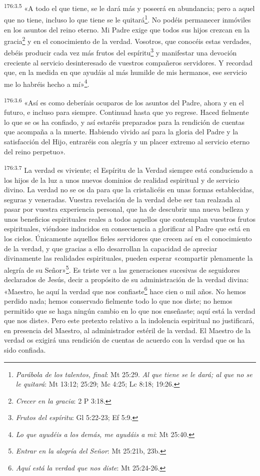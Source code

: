\par 
\textsuperscript{176:3.5} «A todo el que tiene, se le dará más y poseerá en abundancia; pero a aquel que no tiene, incluso lo que tiene se le quitará\footnote{\textit{Parábola de los talentos, final}: Mt 25:29. \textit{Al que tiene se le dará; al que no se le quitará}: Mt 13:12; 25:29; Mc 4:25; Lc 8:18; 19:26.}. No podéis permanecer inmóviles en los asuntos del reino eterno. Mi Padre exige que todos sus hijos crezcan en la gracia\footnote{\textit{Crecer en la gracia}: 2 P 3:18.} y en el conocimiento de la verdad. Vosotros, que conocéis estas verdades, debéis producir cada vez más frutos del espíritu\footnote{\textit{Frutos del espíritu}: Gl 5:22-23; Ef 5:9.} y manifestar una devoción creciente al servicio desinteresado de vuestros compañeros servidores. Y recordad que, en la medida en que ayudáis al más humilde de mis hermanos, ese servicio me lo habréis hecho a mí»\footnote{\textit{Lo que ayudéis a los demás, me ayudáis a mi}: Mt 25:40.}.

\par 
\textsuperscript{176:3.6} «Así es como deberíais ocuparos de los asuntos del Padre, ahora y en el futuro, e incluso para siempre. Continuad hasta que yo regrese. Haced fielmente lo que se os ha confiado, y así estaréis preparados para la rendición de cuentas que acompaña a la muerte. Habiendo vivido así para la gloria del Padre y la satisfacción del Hijo, entraréis con alegría y un placer extremo al servicio eterno del reino perpetuo».

\par 
\textsuperscript{176:3.7} La verdad es viviente; el Espíritu de la Verdad siempre está conduciendo a los hijos de la luz a unos nuevos dominios de realidad espiritual y de servicio divino. La verdad no se os da para que la cristalicéis en unas formas establecidas, seguras y veneradas. Vuestra revelación de la verdad debe ser tan realzada al pasar por vuestra experiencia personal, que ha de descubrir una nueva belleza y unos beneficios espirituales reales a todos aquellos que contemplan vuestros frutos espirituales, viéndose inducidos en consecuencia a glorificar al Padre que está en los cielos. Únicamente aquellos fieles servidores que crecen así en el conocimiento de la verdad, y que gracias a ello desarrollan la capacidad de apreciar divinamente las realidades espirituales, pueden esperar «compartir plenamente la alegría de su Señor»\footnote{\textit{Entrar en la alegría del Señor}: Mt 25:21b, 23b.}. Es triste ver a las generaciones sucesivas de seguidores declarados de Jesús, decir a propósito de su administración de la verdad divina: «Maestro, he aquí la verdad que nos confiaste\footnote{\textit{Aquí está la verdad que nos diste}: Mt 25:24-26.} hace cien o mil años. No hemos perdido nada; hemos conservado fielmente todo lo que nos diste; no hemos permitido que se haga ningún cambio en lo que nos enseñaste; aquí está la verdad que nos diste». Pero este pretexto relativo a la indolencia espiritual no justificará, en presencia del Maestro, al administrador estéril de la verdad. El Maestro de la verdad os exigirá una rendición de cuentas de acuerdo con la verdad que os ha sido confiada.

